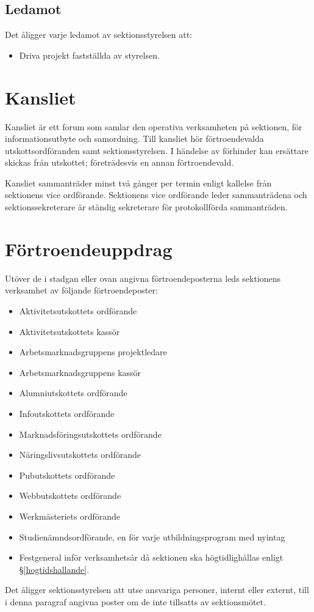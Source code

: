 \documentclass{datateknologsektionen-document}
\begin{document}
\subsection{Ledamot}
\label{ledamot}
Det åligger varje ledamot av sektionsstyrelsen att:
\begin{itemize}
  \item Driva projekt fastställda av styrelsen.
\end{itemize}

\section{Kansliet}
Kansliet är ett forum som samlar den operativa verksamheten på sektionen, för
informationsutbyte och samordning. Till kansliet hör förtroendevalda utskottsordföranden
samt sektionsstyrelsen. I händelse av förhinder kan ersättare skickas från utskottet;
företrädesvis en annan förtroendevald.

Kansliet sammanträder minst två gånger per termin enligt kallelse från sektionens
vice ordförande. Sektionens vice ordförande leder sammanträdena och sektionssekreterare
är ständig sekreterare för protokollförda sammanträden.

\section{Förtroendeuppdrag}
Utöver de i stadgan eller ovan angivna förtroendeposterna leds sektionens verksamhet av följande förtroendeposter:
\begin{itemize}
  \item Aktivitetsutskottets ordförande
  \item Aktivitetsutskottets kassör
  \item Arbetsmarknadsgruppens projektledare
  \item Arbetsmarknadsgruppens kassör
  \item Alumniutskottets ordförande
  \item Infoutskottets ordförande
  \item Marknadsföringsutskottets ordförande
  \item Näringslivsutskottets ordförande
  \item Pubutskottets ordförande
  \item Webbutskottets ordförande
  \item Werkmästeriets ordförande
  \item Studienämndsordförande, en för varje utbildningsprogram med nyintag
  \item Festgeneral inför verksamhetsår då sektionen ska högtidlighållas enligt \S \ref{hogtidshallande}.
\end{itemize}
Det åligger sektionsstyrelsen att utse ansvariga personer, internt eller externt, till i denna paragraf angivna poster om de inte tillsatts av sektionsmötet.
\end{document}
